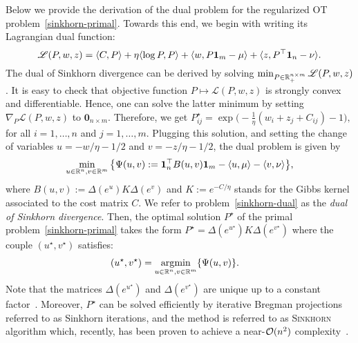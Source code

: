 Below we provide the derivation of the dual problem for the regularized OT problem~\eqref{sinkhorn-primal}. Towards this end, we begin with writing its Lagrangian dual function:
\begin{equation*}
  \mathscr{L}(P,w, z) = \langle C,P \rangle + \eta \langle \log P, P \rangle + \langle w, P\mathbf{1}_m - \mu \rangle + \langle z,P^\top \mathbf{1}_n - \nu \rangle.
\end{equation*}
The dual of Sinkhorn divergence can be derived by solving $\min_{P \in {\mathbb{R}}_+^{n\times m}}\mathscr{L}(P,w, z)$. It is easy to check that objective function $P\mapsto \mathscr{L}(P,w, z)$ is strongly convex and differentiable. Hence, one can solve the latter minimum by setting $\nabla_P \mathscr{L}(P,w, z)$ to $\mathbf{0}_{n\times m}$. Therefore, we get $  P^\star_{ij} = \exp\big(- \frac{1}{\eta} (w_i + z_j + C_{ij}) - 1\big), 
$ for all $i=1, \ldots, n$ and $j=1, \ldots, m$. Plugging this solution,  and setting the change of variables $u = -w/\eta - 1/2$ and $v = - z/\eta - 1/2$, the dual problem is given by
\begin{equation}
\label{sinkhorn-dual}
\min_{u \in {\mathbb{R}}^n, v\in{\mathbb{R}}^m}\big\{\Psi(u,v):= \mathbf{1}_n^\top B(u,v)\mathbf{1}_m - \langle u, \mu \rangle - \langle v, \nu \rangle \big\},
\end{equation}
where $B(u,v) := \Delta(e^{u}) K \Delta(e^{v})$ and $K := e^{-C/\eta}$ stands for the Gibbs kernel associated to the cost matrix $C$. 
We refer to problem~\eqref{sinkhorn-dual} as the \emph{dual of Sinkhorn divergence}. Then, the optimal solution $P^\star$ of the primal problem~\eqref{sinkhorn-primal} takes the form $P^\star = \Delta(e^{u^\star}) K \Delta(e^{v^\star})$
where the couple $(u^\star, v^\star)$ satisfies:
\begin{align*}
\label{sinkhorn-dual}
  (u^\star, v^\star) &= \operatorname*{\arg\!\min}_{u \in {\mathbb{R}}^{n}, v\in {\mathbb{R}}^m} \{\Psi(u,v)\}.
\end{align*}
Note that the matrices $\Delta(e^{u^\star})$ and $\Delta(e^{v^\star})$ are unique up to a constant factor~\citep{sinkhorn1967}. Moreover, $P^\star$ can be solved efficiently by iterative Bregman projections~\citep{benamou2015IterativeBP} referred to as Sinkhorn iterations, and the method is referred to as \textsc{Sinkhorn} algorithm which, recently, has been proven to achieve a near-$\mathcal{O}(n^2)$ complexity~\citep{altschulernips17}.

